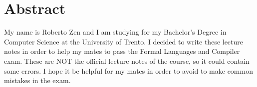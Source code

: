 \chapter*{Abstract}
My name is Roberto Zen and I am studying for my Bachelor’s Degree in Computer Science at the University of Trento.
I decided to write these lecture notes in order to help my mates to pass the Formal Languages and Compiler exam. These are NOT the official lecture notes of the course, so it could contain some errors.
I hope it be helpful for my mates in order to avoid to make common mistakes in the exam.